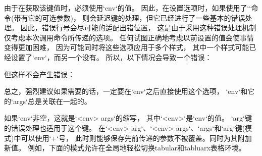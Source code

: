   由于在获取该键值时，必须使用`env`的值。
  因此，在设置选项时，如果使用了``命令(带有它的可选参数)，
  则会延迟键的处理，但它已经进行了一些基本的错误处理。
  因此，错误行号会尽可能的适配出错位置，
  这是由于采用这种错误处理机制仅考虑本次调用命令所传递的选项。
  任何试图正确地考虑以前设置的值会使事情变得更加困难，
  因为可能同时将这些选项应用于多个样式，
  其中一个样式可能已经设置了`env`，而另一个没有。
  所以，以下情况会导致一个错误：

  \begin{examplecode}
  \end{examplecode}

  但这样不会产生错误：

  \begin{examplecode}
  \end{examplecode}

  总之，强烈建议如果需要的话，一定要在`env`之后直接使用这个选项，
  `env`和它的`args`总是关联在一起的。

  \begin{examplecode}
  \end{examplecode}

  如果`env`非空，这就是`<env> args`的缩写，
  其中`<env>`是`env`的值。
  `arg`键的错误处理也适用于这个键。
  在`<env> arg`、`<env> args`、`args`和`arg`键(模式)中可以使用`+`号，
  此时则能够保存先前传递的参数不被覆盖。同时为其附加新值。
  例如，下面的模式允许在全局地轻松切换tabular和tabluarx表格环境。

